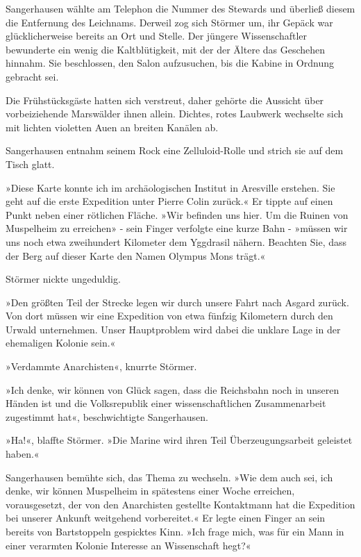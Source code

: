 \bigpar

Sangerhausen wählte am Telephon die Nummer des Stewards und
überließ diesem die Entfernung des Leichnams. Derweil zog sich
Störmer um, ihr Gepäck war glücklicherweise bereits an Ort und
Stelle. Der jüngere Wissenschaftler bewunderte ein wenig die
Kaltblütigkeit, mit der der Ältere das Geschehen hinnahm. Sie
beschlossen, den Salon aufzusuchen, bis die Kabine in Ordnung
gebracht sei.

Die Frühstücksgäste hatten sich verstreut, daher gehörte die
Aussicht über vorbeiziehende Marswälder ihnen allein. Dichtes,
rotes Laubwerk wechselte sich mit lichten violetten Auen an breiten
Kanälen ab.

Sangerhausen entnahm seinem Rock eine Zelluloid-Rolle und strich
sie auf dem Tisch glatt.

»Diese Karte konnte ich im archäologischen Institut in Aresville
erstehen. Sie geht auf die erste Expedition unter Pierre Colin
zurück.« Er tippte auf einen Punkt neben einer rötlichen Fläche.
»Wir befinden uns hier. Um die Ruinen von Muspelheim zu erreichen»
- sein Finger verfolgte eine kurze Bahn - »müssen wir uns noch etwa
zweihundert Kilometer dem Yggdrasil nähern. Beachten Sie, dass der
Berg auf dieser Karte den Namen Olympus Mons trägt.«

Störmer nickte ungeduldig.

»Den größten Teil der Strecke legen wir durch unsere Fahrt nach
Asgard zurück. Von dort müssen wir eine Expedition von etwa fünfzig
Kilometern durch den Urwald unternehmen. Unser Hauptproblem wird
dabei die unklare Lage in der ehemaligen Kolonie sein.«

»Verdammte Anarchisten«, knurrte Störmer.

»Ich denke, wir können von Glück sagen, dass die Reichsbahn noch in
unseren Händen ist und die Volksrepublik einer wissenschaftlichen
Zusammenarbeit zugestimmt hat«, beschwichtigte Sangerhausen.

»Ha!«, blaffte Störmer. »Die Marine wird ihren Teil
Überzeugungsarbeit geleistet haben.«

Sangerhausen bemühte sich, das Thema zu wechseln. »Wie dem auch
sei, ich denke, wir können Muspelheim in spätestens einer Woche
erreichen, vorausgesetzt, der von den Anarchisten gestellte
Kontaktmann hat die Expedition bei unserer Ankunft weitgehend
vorbereitet.« Er legte einen Finger an sein bereits von
Bartstoppeln gespicktes Kinn. »Ich frage mich, was für ein Mann in
einer verarmten Kolonie Interesse an Wissenschaft hegt?«

